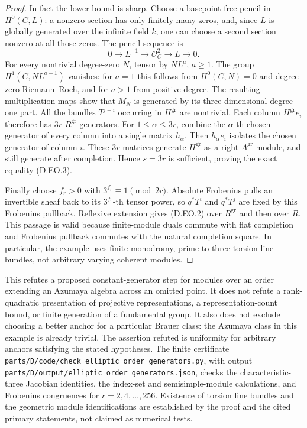 \begin{proof}
In fact the lower bound is sharp. Choose a basepoint-free pencil
in $H^0(C,L)$: a nonzero section has only finitely many zeros,
and, since $L$ is globally generated over the infinite field $k$,
one can choose a second section nonzero at all those zeros.
The pencil sequence is
\[
 0\longrightarrow L^{-1}\longrightarrow\mathcal O_C^2
       \longrightarrow L\longrightarrow0.
\]
For every nontrivial degree-zero $N$, tensor by $N L^a$, $a\ge1$.
The group $H^1(C,N L^{a-1})$ vanishes: for $a=1$ this follows
from $H^0(C,N)=0$ and degree-zero Riemann--Roch, and for $a>1$
from positive degree. The resulting multiplication maps show
that $M_N$ is generated by its three-dimensional degree-one part.
All the bundles $T^{j-i}$ occurring in $H^{\mathrm{gr}}$ are
nontrivial. Each column $H^{\mathrm{gr}}e_i$ therefore has $3r$
$R^{\mathrm{gr}}$-generators. For $1\le\alpha\le3r$, combine
the $\alpha$-th chosen generator of every column into a single
matrix $h_\alpha$. Then $h_\alpha e_i$ isolates the chosen
generator of column $i$. These $3r$ matrices generate
$H^{\mathrm{gr}}$ as a right $A^{\mathrm{gr}}$-module, and still
generate after completion. Hence $s=3r$ is sufficient, proving
the exact equality (D.EO.3).

Finally choose $f_r>0$ with $3^{f_r}\equiv1\pmod{2r}$.
Absolute Frobenius pulls an invertible sheaf back to its
$3^{f_r}$-th tensor power, so $q^*T^i$ and $q^*T^j$ are fixed
by this Frobenius pullback. Reflexive extension gives (D.EO.2)
over $R^{\mathrm{gr}}$ and then over $R$. This passage is valid
because finite-module duals commute with flat completion and
Frobenius pullback commutes with the natural completion square.
In particular, the example uses finite-monodromy, prime-to-three
torsion line bundles, not arbitrary varying coherent modules.
\end{proof}

\begin{remark}
This refutes a proposed constant-generator step for modules over
an order extending an Azumaya algebra across an omitted point.
It does not refute a rank-quadratic presentation of projective
representations, a representation-count bound, or finite generation
of a fundamental group. It also does not exclude choosing a better
anchor for a particular Brauer class: the Azumaya class in this
example is already trivial. The assertion refuted is uniformity
for arbitrary anchors satisfying the stated hypotheses.
The finite certificate
\nolinkurl{parts/D/code/check_elliptic_order_generators.py}, with
output \nolinkurl{parts/D/output/elliptic_order_generators.json},
checks the characteristic-three Jacobian identities, the index-set
and semisimple-module calculations, and Frobenius congruences for
$r=2,4,\ldots,256$. Existence of torsion line bundles and the
geometric module identifications are established by the proof and
the cited primary statements, not claimed as numerical tests.
\end{remark}
